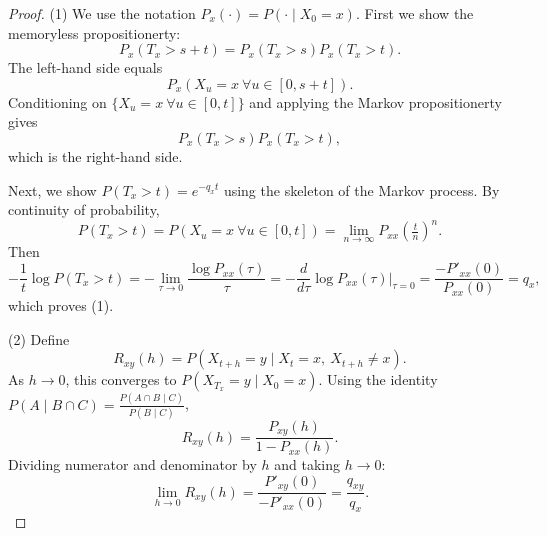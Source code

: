 \documentclass{ximera}
\begin{document}
\begin{proof}
(1) We use the notation $P_x(\cdot) = P(\cdot \mid X_0 = x)$. First we show the memoryless propositionerty:
\[
P_x(T_x > s + t) = P_x(T_x > s) P_x(T_x > t).
\]
The left-hand side equals
\[
P_x(X_u = x\ \forall u \in [0, s+t]).
\]
Conditioning on $\{X_u = x\ \forall u \in [0,t]\}$ and applying the Markov propositionerty gives
\[
P_x(T_x > s) P_x(T_x > t),
\]
which is the right-hand side.

Next, we show $P(T_x > t) = e^{-q_x t}$ using the skeleton of the Markov process. By continuity of probability,
\[
P(T_x > t) = P(X_u = x\ \forall u \in [0,t]) = \lim_{n \to \infty} P_{xx}\!\left(\tfrac{t}{n}\right)^n.
\]
Then
\[
-\frac{1}{t} \log P(T_x > t) = -\lim_{\tau \to 0} \frac{\log P_{xx}(\tau)}{\tau} = -\frac{d}{d\tau}\log P_{xx}(\tau)\Big|_{\tau=0} = \frac{-P'_{xx}(0)}{P_{xx}(0)} = q_x,
\]
which proves (1).

(2) Define
\[
R_{xy}(h) = P(X_{t+h} = y \mid X_t = x,\ X_{t+h} \neq x).
\]
As $h \to 0$, this converges to $P(X_{T_x} = y \mid X_0 = x)$. Using the identity $P(A \mid B \cap C) = \frac{P(A \cap B \mid C)}{P(B \mid C)}$,
\[
R_{xy}(h) = \frac{P_{xy}(h)}{1 - P_{xx}(h)}.
\]
Dividing numerator and denominator by $h$ and taking $h \to 0$:
\[
\lim_{h \to 0} R_{xy}(h) = \frac{P'_{xy}(0)}{-P'_{xx}(0)} = \frac{q_{xy}}{q_x}.
\]
\qedhere
\end{proof}
\end{document}
